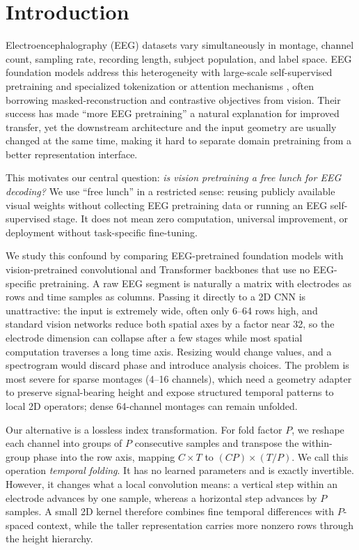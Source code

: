 \section{Introduction}

Electroencephalography (EEG) datasets vary simultaneously in montage, channel
count, sampling rate, recording length, subject population, and label space.
EEG foundation models address this heterogeneity with large-scale
self-supervised pretraining and specialized tokenization or attention
mechanisms \citep{yang2023biot,jiang2024labram,wang2025cbramod,elouahidi2025reve}, often borrowing
masked-reconstruction and contrastive objectives from vision. Their success
has made ``more EEG pretraining'' a natural explanation for improved transfer,
yet the downstream architecture and the input geometry are usually changed at
the same time, making it hard to separate domain pretraining from a better
representation interface.

This motivates our central question: \emph{is vision pretraining a free lunch
for EEG decoding?}  We use ``free lunch'' in a restricted sense: reusing
publicly available visual weights without collecting EEG pretraining data or
running an EEG self-supervised stage. It does not mean zero computation,
universal improvement, or deployment without task-specific fine-tuning.

We study this confound by comparing EEG-pretrained foundation models with
vision-pretrained convolutional and Transformer backbones that use no
EEG-specific pretraining. A raw EEG segment is naturally a matrix with
electrodes as rows and time samples as columns. Passing it directly to a 2D
CNN is unattractive: the input is extremely wide, often only 6--64 rows high,
and standard vision networks reduce both spatial axes by a factor near 32, so
the electrode dimension can collapse after a few stages while most spatial
computation traverses a long time axis. Resizing would change values, and a
spectrogram would discard phase and introduce analysis choices. The problem is
most severe for sparse montages (4--16 channels), which need a geometry
adapter to preserve signal-bearing height and expose structured temporal
patterns to local 2D operators; dense 64-channel montages can remain unfolded.

Our alternative is a lossless index transformation.  For fold factor $P$, we
reshape each channel into groups of $P$ consecutive samples and transpose the
within-group phase into the row axis, mapping $C\times T$ to
$(CP)\times(T/P)$.  We call this operation \emph{temporal folding}.  It has no
learned parameters and is exactly invertible.  However, it changes what a
local convolution means: a vertical step within an electrode advances by one
sample, whereas a horizontal step advances by $P$ samples.  A small 2D kernel
therefore combines fine temporal differences with $P$-spaced context, while
the taller representation carries more nonzero rows through the height
hierarchy.

